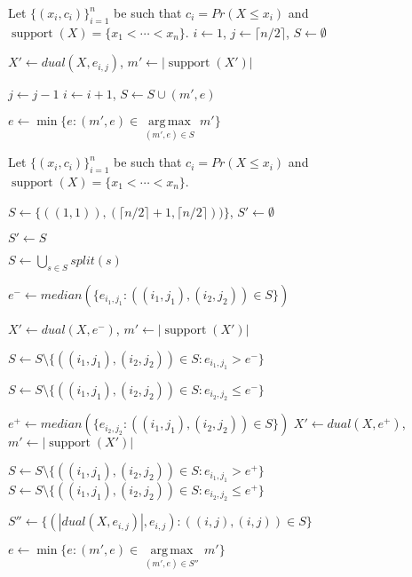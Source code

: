 \documentclass[letterpaper]{article} %
\DeclareMathOperator{\supp}{support}
\begin{document}
\begin{algorithm}
	\DontPrintSemicolon
	Let $\{(x_i, c_i)\}_{i=1}^n$ be such that $c_i=Pr(X \leq x_i)$ and $\supp(X)=\{x_1 < \cdots < x_n\}$.\;
    $i \gets 1$, $j \gets \lceil n/2 \rceil$, $S \gets \emptyset$\;

	{
		
		
		$X' \gets dual(X,e_{i,j})$, $m' \gets |\supp(X')|$\;
	
		{
			$j \gets j - 1$
		}
		 {
			$i \gets i + 1$, $S \gets S \cup (m',e)$			
		}
	}
	$e \gets \min\{e\colon (m',e) \in \underset{(m',e)\in S}{\operatorname{arg\,max}}\, m'\}$\;
	
	\caption{$saddlebackApprox(X,m)$}   
	\label{alg:saddleback}
\end{algorithm}


\begin{algorithm}
		\DontPrintSemicolon
		Let $\{(x_i, c_i)\}_{i=1}^n$ be such that $c_i=Pr(X \leq x_i)$ and $\supp(X)=\{x_1 < \cdots < x_n\}$.\;
		
		$S \gets  \{ ((1, 1)),(\lceil n/2 \rceil+1,\lceil n/2 \rceil)) \}$, $S' \gets \emptyset$\;
		
		
		{
			$S' \gets S$\;

			$S \gets \displaystyle \bigcup_{s \in S} split(s)$\;
			
			$e^- {\gets} median(\{ e_{i_1,j_1} \colon ((i_1,j_1),(i_2,j_2)) \in S \}) $\;		
			
			$X' \gets dual(X,e^-)$, $m' \gets |\supp(X')|$\;

			 {
				$S \gets S \setminus \{ ((i_1,j_1),(i_2,j_2)) {\in} S \colon e_{i_1,j_1} {>} e^- \}$ \;
			}
			
			\Else %
			{
				$S \gets S \setminus \{ ((i_1,j_1),(i_2,j_2)) {\in} S \colon e_{i_2,j_2} {\leq} e^- \}$ \;
			}
		
			$e^+ {\gets} median(\{ e_{i_2,j_2} \colon ((i_1,j_1),(i_2,j_2)) \in S \}) $\;
			$X' \gets dual(X,e^+)$, $m' \gets |\supp(X')|$\;

			 {
				$S \gets S \setminus \{ ((i_1,j_1),(i_2,j_2)) {\in} S \colon e_{i_1,j_1} {>} e^+ \}$ \;
			}
			\Else %
			{
				$S \gets S \setminus \{ ((i_1,j_1),(i_2,j_2)) {\in} S \colon e_{i_2,j_2} {\leq} e^+ \}$ \;
			}
			
		
		}
	
		$S'' \gets \{(|dual(X,e_{i,j})|,e_{i,j}) \colon ((i,j),(i,j)) \in S\}$\;	
	
		$e \gets \min\{e\colon (m',e) \in \underset{(m',e)\in S''}{\operatorname{arg\,max}}\, m'\}$\;

		\caption{$linApprox(X,m)$}   
		\label{alg:linear}
	\end{algorithm}
\end{document}

